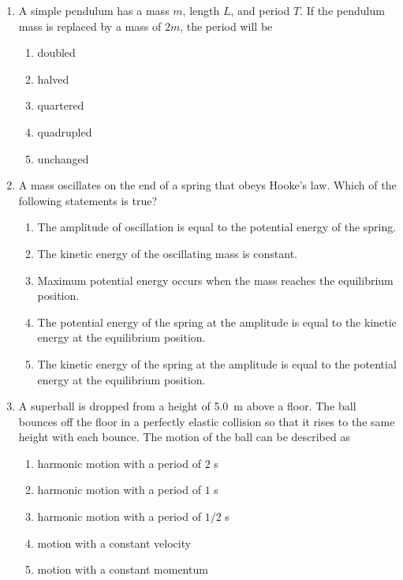 \documentclass{../../oss-apphys}
\begin{document}
\genheader


\genmultidirections

\gengravity

\raggedcolumns
\begin{multicols}{2}

  \begin{enumerate}[leftmargin=18pt]

  \item A simple pendulum has a mass $m$, length $L$, and period $T$. If the
    pendulum mass is replaced by a mass of $2m$, the period will be
    \begin{enumerate}[noitemsep,topsep=0pt]
    \item doubled
    \item halved
    \item quartered
    \item quadrupled
    \item unchanged
    \end{enumerate}

  \item A mass oscillates on the end of a spring that obeys Hooke's law. Which
    of the following statements is true?
    \begin{enumerate}[noitemsep,topsep=0pt,leftmargin=18pt]
    \item The amplitude of oscillation is equal to the potential energy of the
      spring.
    \item The kinetic energy of the oscillating mass is constant.
    \item Maximum potential energy occurs when the mass reaches the
      equilibrium position.
    \item The potential energy of the spring at the amplitude is equal to the
      kinetic energy at the equilibrium position.
    \item The kinetic energy of the spring at the amplitude is equal to the
      potential energy at the equilibrium position.
    \end{enumerate}

  \item A superball is dropped from a height of \SI{5.0}{\m} above a floor.
    The ball bounces off the floor in a perfectly elastic collision so that it
    rises to the same height with each bounce. The motion of the ball can be
    described as
    \begin{enumerate}[noitemsep,topsep=0pt]
    \item harmonic motion with a period of $2$ \si{s}
    \item harmonic motion with a period of $1$ \si{s}
    \item harmonic motion with a period of $1/2$ \si{s}
    \item motion with a constant velocity
    \item motion with a constant momentum
    \end{enumerate}


\end{enumerate}
\end{multicols}
\end{document}
